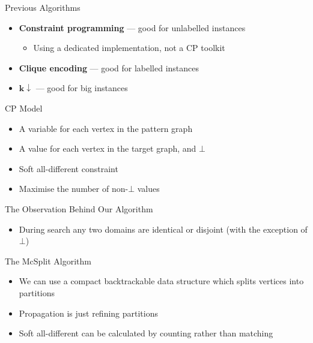 \documentclass{beamer}
\begin{document}
\begin{frame}{Previous Algorithms}

    \begin{itemize}
        \item \textbf{Constraint programming} --- good for unlabelled instances
            \begin{itemize}
                \item Using a dedicated implementation, not a CP toolkit
            \end{itemize}
        \item \textbf{Clique encoding} --- good for labelled instances
        \item $\mathbf{k{\downarrow}}$ --- good for big instances
    \end{itemize}

\end{frame}

\begin{frame}{CP Model}

    \begin{itemize}
        \item A variable for each vertex in the pattern graph
        \item A value for each vertex in the target graph, and $\bot$
        \item Soft all-different constraint
        \item Maximise the number of non-$\bot$ values
    \end{itemize}

\end{frame}

\begin{frame}{The Observation Behind Our Algorithm}

    \begin{itemize}
        \item During search any two domains are identical or
            disjoint (with the exception of $\bot$)
    \end{itemize}

\end{frame}

\begin{frame}{The McSplit Algorithm}
    \begin{itemize}
        \item We can use a compact backtrackable data structure which splits vertices into
            partitions
        \item Propagation is just refining partitions
        \item Soft all-different can be calculated by counting rather than matching
    \end{itemize}
\end{frame}
\end{document}

